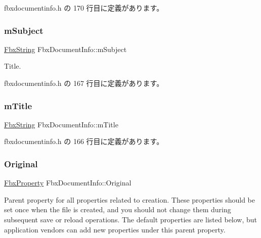  fbxdocumentinfo.\+h の 170 行目に定義があります。

\mbox{\label{class_fbx_document_info_a2ef18e00ea86b5ebb46cab156ee1dffb}} 
\subsubsection{\texorpdfstring{m\+Subject}{mSubject}}
{\footnotesize\ttfamily \hyperlink{class_fbx_string}{Fbx\+String} Fbx\+Document\+Info\+::m\+Subject}



Title. 



 fbxdocumentinfo.\+h の 167 行目に定義があります。

\mbox{\label{class_fbx_document_info_a19d4298a823606afc9501e4915fd4d46}} 
\subsubsection{\texorpdfstring{m\+Title}{mTitle}}
{\footnotesize\ttfamily \hyperlink{class_fbx_string}{Fbx\+String} Fbx\+Document\+Info\+::m\+Title}



 fbxdocumentinfo.\+h の 166 行目に定義があります。

\mbox{\label{class_fbx_document_info_acb08111b968a17d25bdb2e01391500b8}} 
\subsubsection{\texorpdfstring{Original}{Original}}
{\footnotesize\ttfamily \hyperlink{class_fbx_property}{Fbx\+Property} Fbx\+Document\+Info\+::\+Original}

Parent property for all properties related to creation. These properties should be set once when the file is created, and you should not change them during subsequent save or reload operations. The default properties are listed below, but application vendors can add new properties under this parent property. 

